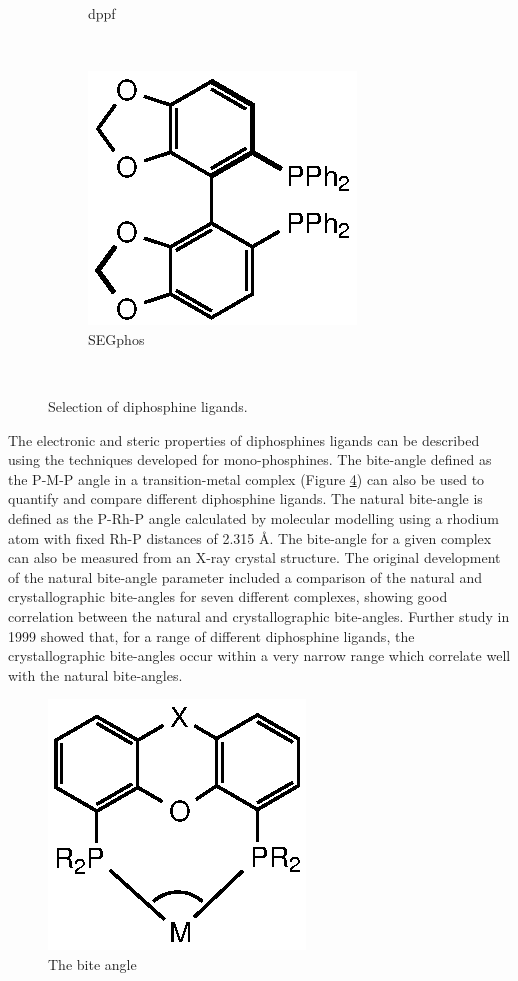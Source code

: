 \begin{figure}[htbp]
\begin{subfigure}[b]{0.3\textwidth}
	\caption{dppf}
	\label{dppf}
\end{subfigure}
~
\begin{subfigure}[b]{0.3\textwidth}
	\centering
	\includegraphics{../Figures/Diphosphines/SEGphos.eps}
	\caption{SEGphos}
	\label{SEGphos}
\end{subfigure}
\\
\caption[Selection of diphosphine ligands]{Selection of diphosphine ligands.}
\label{diphosphineligands}
\end{figure}

The electronic and steric properties of diphosphines ligands can be described using the techniques developed for mono-phosphines.\cite{Tolman1977, Banger2009, Dunne1991, Roodt2003, Mann1980, Tiburcio2006, Tolman1970}  The bite-angle defined as the P-M-P angle in a transition-metal complex (Figure \ref{Biteangle}) can also be used to quantify and compare different diphosphine ligands.  The natural bite-angle is defined as the P-Rh-P angle calculated by molecular modelling using a rhodium atom with fixed Rh-P distances of 2.315 \si{\angstrom}.\cite{Casey1990}  The bite-angle for a given complex can also be measured from an X-ray crystal structure.  The original development of the natural bite-angle parameter included a comparison of the natural and crystallographic bite-angles for seven different complexes, showing good correlation between the natural and crystallographic bite-angles.\cite{Casey1990}  Further study in 1999 showed that, for a range of different diphosphine ligands, the crystallographic bite-angles occur within a very narrow range which correlate well with the natural bite-angles.\cite{Dierkes1999}

\begin{figure}[ht]
\centering
\includegraphics[]{../Figures/Biteangle.eps}
\caption[The bite angle]{The bite angle}
\label{Biteangle}
\end{figure}

